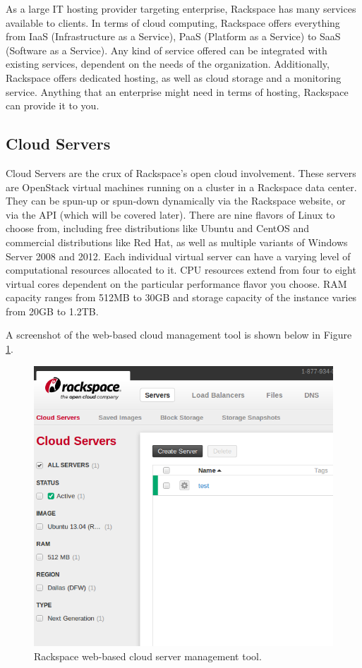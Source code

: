 \documentclass[DIV=calc, paper=letter, fontsize=12pt, twocolumn]{scrartcl}	 %
\begin{document}
As a large IT hosting provider targeting enterprise, Rackspace has many
services available to clients. In terms of cloud computing, Rackspace
offers everything from IaaS (Infrastructure as a Service), PaaS (Platform as a Service)
to SaaS (Software as a Service). Any kind of service offered can be integrated
with existing services, dependent on the needs of the organization. Additionally,
Rackspace offers dedicated hosting, as well as cloud storage and a monitoring
service. Anything that an enterprise might need in terms of hosting, Rackspace
can provide it to you. 

\subsection*{Cloud Servers}

Cloud Servers are the crux of Rackspace's open cloud involvement. These servers are
OpenStack virtual machines running on a cluster in a Rackspace data center.
They can be spun-up or spun-down dynamically via the Rackspace website, or via
the API (which will be covered later). There are nine flavors of Linux to choose
from, including free distributions like Ubuntu and CentOS and commercial distributions
like Red Hat, as well as multiple variants of Windows Server 2008 and 2012. Each
individual virtual server can have a varying level of computational resources 
allocated to it. CPU resources extend from four to eight virtual cores dependent
on the particular performance flavor you choose. RAM capacity ranges from 512MB
to 30GB and storage capacity of the instance varies from 20GB to 1.2TB.

A screenshot of the web-based cloud management tool is shown below in 
Figure \ref{fig:cloudinterface}.

\begin{figure}[ht!]
\centering
\includegraphics[width=\columnwidth]{cloudinterface.png}
\caption{Rackspace web-based cloud server management tool.}
\label{fig:cloudinterface}
\end{figure}
\end{document}
